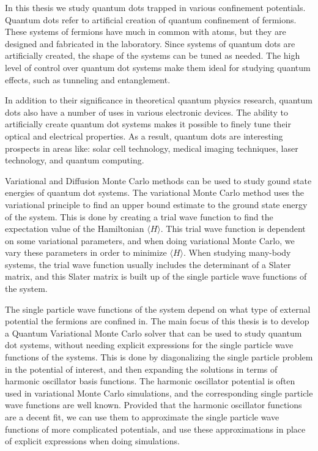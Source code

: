 \documentclass[../main.tex]{subfiles}
\begin{document}
In this thesis we study quantum dots trapped in various confinement potentials. Quantum dots refer to artificial creation of quantum confinement of fermions. These systems of fermions have much in common with atoms, but they are designed and fabricated in the laboratory\cite{Manninen}. Since systems of quantum dots are artificially created, the shape of the systems can be tuned as needed. The high level of control over quantum dot systems make them ideal for studying quantum effects, such as tunneling and entanglement. 

In addition to their significance in theoretical quantum physics research, quantum dots also have a number of uses in various electronic devices. The ability to artificially create quantum dot systems makes it possible to finely tune their optical and electrical properties. As a result, quantum dots are interesting prospects in areas like: solar cell technology\cite{QDotSolar, QDotSolar2}, medical imaging techniques\cite{QDotMed, QDotMed2}, laser technology\cite{QDotLaser, QDotLaser2}, and quantum computing\cite{QDotComp, QDotComp2}.

Variational and Diffusion Monte Carlo methods can be used to study gound state energies of quantum dot systems\cite{QMC1, QMC2, QMC3, QDotBenchmarks}. The variational Monte Carlo method uses the variational principle to find an upper bound estimate to the ground state energy of the system. This is done by creating a trial wave function to find the expectation value of the Hamiltonian $\langle H \rangle$. This trial wave function is dependent on some variational parameters, and when doing variational Monte Carlo, we vary these parameters in order to minimize $\langle H \rangle$. When studying many-body systems, the trial wave function usually includes the determinant of a Slater matrix, and this Slater matrix is built up of the single particle wave functions of the system.

The single particle wave functions of the system depend on what type of external potential the fermions are confined in. The main focus of this thesis is to develop a Quantum Variational Monte Carlo solver that can be used to study quantum dot systems, without needing explicit expressions for the single particle wave functions of the systems. This is done by diagonalizing the single particle problem in the potential of interest, and then expanding the solutions in terms of harmonic oscillator basis functions. The harmonic oscillator potential is often used in variational Monte Carlo simulations, and the corresponding single particle wave functions are well known. Provided that the harmonic oscillator functions are a decent fit, we can use them to approximate the single particle wave functions of more complicated potentials, and use these approximations in place of explicit expressions when doing simulations.
\end{document}
